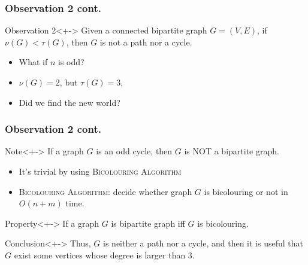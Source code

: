 \documentclass{beamer}
\begin{document}
\begin{frame}
  \frametitle{Observation 2 cont.}
  \begin{exampleblock}{Observation 2}<+->
   Given a connected bipartite graph $G=(V,E)$, if $\nu{(G)}<\tau{(G)}$, then $G$ is not a path nor a cycle.
  \end{exampleblock}
  \begin{itemize}
  \item<+-> What if $n$ is odd?
    \begin{center}
    \end{center}
  \item<+-> $\nu{(G)}=2$, but $\tau{(G)}=3$, 
  \item<+-> Did we find the new world? 
  \end{itemize}
\end{frame}

\begin{frame}
  \frametitle{Observation 2 cont.}
  \begin{block}{Note}<+->
   If a graph $G$ is an \alert{odd cycle}, then $G$ is \alert{NOT} a bipartite graph.
  \end{block}
  \begin{itemize}[<+->]
  \item It's trivial by using \textsc{Bicolouring Algorithm}
  \item \alert{\textsc{Bicolouring Algorithm}}: decide whether graph $G$ is bicolouring or not in $O(n+m)$ time.
  \end{itemize}
  \begin{exampleblock}{Property}<+->
  If a graph $G$ is bipartite graph iff $G$ is bicolouring.
  \end{exampleblock}
  \begin{alertblock}{Conclusion}<+->
  Thus, $G$ is neither a path nor a cycle, and then it is useful that $G$ exist some vertices whose degree is larger than 3.
  \end{alertblock}
\end{frame}
\end{document}
